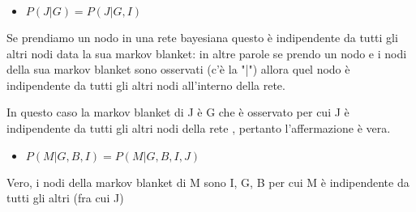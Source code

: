 \documentclass{article}
\begin{document}
\begin{itemize}
	\item \(P(J | G) = P(J | G, I) \)
\end{itemize}

Se prendiamo un nodo in una rete bayesiana questo è indipendente da tutti gli altri nodi data la sua markov blanket: in altre parole se prendo un nodo e i nodi della sua markov blanket sono osservati (c'è la "|") allora quel nodo è indipendente da tutti gli altri nodi all'interno della rete.

In questo caso la markov blanket di J è G che è osservato per cui J è indipendente da tutti gli altri nodi della rete , pertanto l'affermazione è vera.

\begin{itemize}
	\item \(P(M | G, B, I) = P(M | G, B, I, J) \)
\end{itemize}
Vero, i nodi della markov blanket di M sono I, G, B per cui M è indipendente da tutti gli altri (fra cui J)

\pagebreak
	 \begin{center}
	
\end{center}
\end{document}
